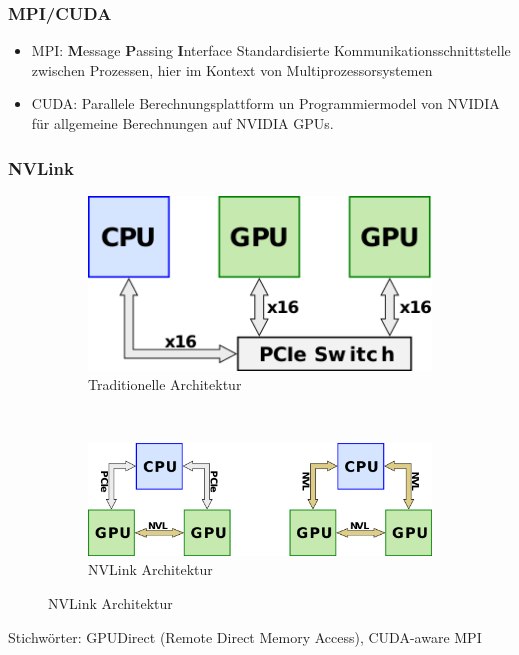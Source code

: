 \frame
{
	\frametitle{MPI/CUDA}
\begin{itemize}
	\item[] MPI\footnotemark[1]: \textbf{M}essage \textbf{P}assing \textbf{I}nterface
	Standardisierte Kommunikationsschnittstelle zwischen Prozessen, hier im Kontext von Multiprozessorsystemen
\item[] CUDA\footnotemark[2]: Parallele Berechnungsplattform un Programmiermodel von NVIDIA für allgemeine Berechnungen auf NVIDIA GPUs.
\end{itemize}
}
\frame
{
	\frametitle{NVLink}
	\begin{figure}
	\begin{subfigure}[t]{0.4\linewidth}
			\includegraphics[width=1\linewidth]{../res/nvlink0.png}
			\caption{Traditionelle Architektur}
			\footnotemark[1]
	\end{subfigure}
~
	\begin{subfigure}[t]{0.4\linewidth}
			\includegraphics[width=1\linewidth]{../res/nvlink1.png}
			\caption{NVLink Architektur}
			\footnotemark[1]
		\end{subfigure}
	\end{figure}
	Stichwörter: GPUDirect (Remote Direct Memory Access), CUDA-aware MPI
}

